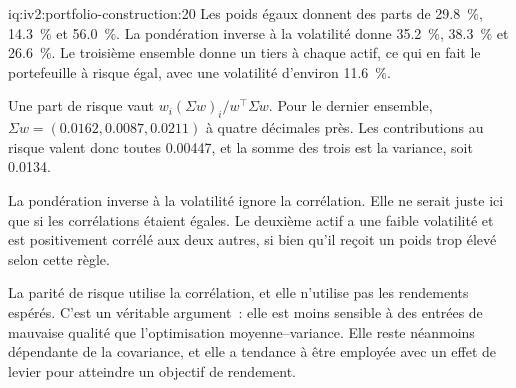 \begin{solution}{iq:iv2:portfolio-construction:20}
Les poids égaux donnent des parts de 29.8~\%, 14.3~\% et 56.0~\%. La pondération inverse à la volatilité donne 35.2~\%, 38.3~\% et 26.6~\%. Le troisième ensemble donne un tiers à chaque actif, ce qui en fait le portefeuille à risque égal, avec une volatilité d'environ 11.6~\%.

Une part de risque vaut $w_i(\Sigma w)_i/w^\top\Sigma w$. Pour le dernier ensemble, $\Sigma w = (0.0162, 0.0087, 0.0211)$ à quatre décimales près. Les contributions au risque valent donc toutes 0.00447, et la somme des trois est la variance, soit 0.0134.

La pondération inverse à la volatilité ignore la corrélation. Elle ne serait juste ici que si les corrélations étaient égales. Le deuxième actif a une faible volatilité et est positivement corrélé aux deux autres, si bien qu'il reçoit un poids trop élevé selon cette règle.

La parité de risque utilise la corrélation, et elle n'utilise pas les rendements espérés. C'est un véritable argument~: elle est moins sensible à des entrées de mauvaise qualité que l'optimisation moyenne--variance. Elle reste néanmoins dépendante de la covariance, et elle a tendance à être employée avec un effet de levier pour atteindre un objectif de rendement.

\end{solution}

